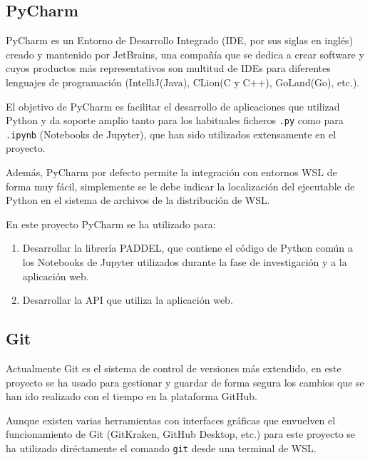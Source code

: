 \subsection{PyCharm}

PyCharm es un Entorno de Desarrollo Integrado (IDE, por sus siglas en inglés)
creado y mantenido por JetBrains, una compañía que se dedica a crear software y
cuyos productos más representativos son multitud de IDEs para diferentes
lenguajes de programación (IntelliJ(Java), CLion(C y C++), GoLand(Go), etc.).

El objetivo de PyCharm es facilitar el desarrollo de aplicaciones que utilizad
Python y da soporte amplio tanto para los habituales ficheros \texttt{.py} como
para \texttt{.ipynb} (Notebooks de Jupyter), que han sido utilizados
extensamente en el proyecto.

Además, PyCharm por defecto permite la integración con entornos WSL de forma muy
fácil, simplemente se le debe indicar la localización del ejecutable de Python
en el sistema de archivos de la distribución de WSL.

En este proyecto PyCharm se ha utilizado para:

\begin{enumerate}
    \item Desarrollar la librería PADDEL, que contiene el código de Python común
    a los Notebooks de Jupyter utilizados durante la fase de investigación y a
    la aplicación web.
    \item Desarrollar la API que utiliza la aplicación web.
\end{enumerate}

\subsection{Git}

Actualmente Git es el sistema de control de versiones más extendido, en este
proyecto se ha usado para gestionar y guardar de forma segura los cambios que se
han ido realizado con el tiempo en la plataforma GitHub.

Aunque existen varias herramientas con interfaces gráficas que envuelven el
funcionamiento de Git (GitKraken, GitHub Desktop, etc.) para este proyecto se ha
utilizado diréctamente el comando \texttt{git} desde una terminal de WSL.
